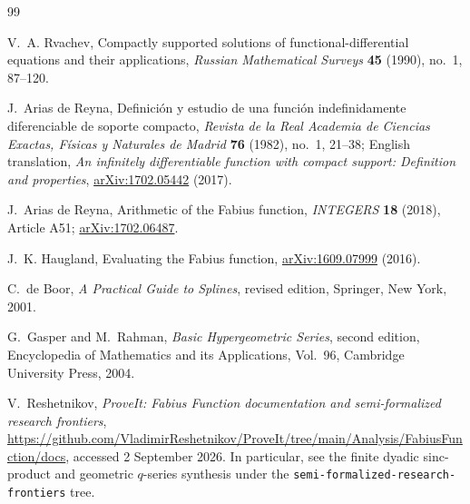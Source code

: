\documentclass[11pt]{article}
\begin{document}
\small
\begin{thebibliography}{99}

V.~A. Rvachev,
\newblock Compactly supported solutions of functional-differential equations and their applications,
\newblock \emph{Russian Mathematical Surveys} \textbf{45} (1990), no.~1, 87--120.

J.~Arias de Reyna,
\newblock Definici\'on y estudio de una funci\'on indefinidamente diferenciable de soporte compacto,
\newblock \emph{Revista de la Real Academia de Ciencias Exactas, F\'isicas y Naturales de Madrid}
\textbf{76} (1982), no.~1, 21--38;
English translation, \emph{An infinitely differentiable function with compact support: Definition and properties},
\href{https://arxiv.org/abs/1702.05442}{arXiv:1702.05442} (2017).

J.~Arias de Reyna,
\newblock Arithmetic of the Fabius function,
\newblock \emph{INTEGERS} \textbf{18} (2018), Article A51;
\href{https://arxiv.org/abs/1702.06487}{arXiv:1702.06487}.

J.~K. Haugland,
\newblock Evaluating the Fabius function,
\newblock \href{https://arxiv.org/abs/1609.07999}{arXiv:1609.07999} (2016).

C.~de Boor,
\newblock \emph{A Practical Guide to Splines}, revised edition,
\newblock Springer, New York, 2001.

G.~Gasper and M.~Rahman,
\newblock \emph{Basic Hypergeometric Series}, second edition,
\newblock Encyclopedia of Mathematics and its Applications, Vol.~96,
Cambridge University Press, 2004.

V.~Reshetnikov,
\newblock \emph{ProveIt: Fabius Function documentation and semi-formalized research frontiers},
\newblock \url{https://github.com/VladimirReshetnikov/ProveIt/tree/main/Analysis/FabiusFunction/docs},
accessed 2 September 2026.  In particular, see the finite dyadic sinc-product and
geometric \(q\)-series synthesis under the \texttt{semi-formalized-research-frontiers} tree.

\end{thebibliography}
\end{document}
